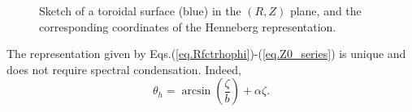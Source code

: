\documentclass[my_thesis.tex]{subfiles}
\begin{document}
\begin{figure}
	\centering
	\caption{Sketch of a toroidal surface (blue) in the $(R,Z)$ plane, and the corresponding coordinates of the Henneberg representation.}
	\label{fig. sketch Henneberg representation}
\end{figure}

The representation given by Eqs.(\ref{eq.Rfctrhophi})-(\ref{eq.Z0_series}) is unique and does not require spectral condensation. Indeed, 
\begin{equation}
	\theta_h = \arcsin\left(\frac{\zeta}{b}\right) + \alpha\zeta. \label{eq. henneberg angle}
\end{equation}
\end{document}

